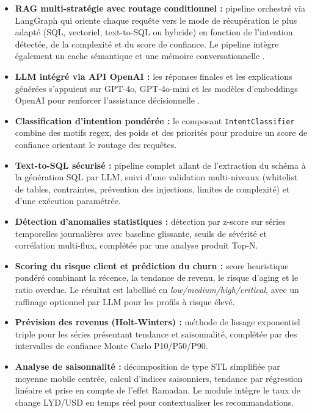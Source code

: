 \documentclass[a4paper,12pt]{report}
\begin{document}
\begin{itemize}
    \item \textbf{RAG multi-stratégie avec routage conditionnel :} pipeline
    orchestré via LangGraph qui oriente chaque requête vers le mode de
    récupération le plus adapté (SQL, vectoriel, text-to-SQL ou hybride) en
    fonction de l'intention détectée, de la complexité et du score de confiance.
    Le pipeline intègre également un cache sémantique et une mémoire
    conversationnelle \cite{ref39}\cite{ref40}.

    \item \textbf{LLM intégré via API OpenAI :} les réponses finales et les
    explications générées s'appuient sur GPT-4o, GPT-4o-mini et les modèles
    d'embeddings OpenAI pour renforcer l'assistance décisionnelle \cite{A4}\cite{ref43}\cite{ref45}.

    \item \textbf{Classification d'intention pondérée :} le composant
    \texttt{IntentClassifier} combine des motifs regex, des poids et des
    priorités pour produire un score de confiance orientant le routage des
    requêtes.

    \item \textbf{Text-to-SQL sécurisé :} pipeline complet allant de l'extraction
    du schéma à la génération SQL par LLM, suivi d'une validation multi-niveaux
    (whitelist de tables, contraintes, prévention des injections, limites de complexité) et d'une exécution paramétrée.

    \item \textbf{Détection d'anomalies statistiques :} détection par z-score sur
    séries temporelles journalières avec baseline glissante, seuils de sévérité
    et corrélation multi-flux, complétée par une analyse produit Top-N.

    \item \textbf{Scoring du risque client et prédiction du churn :} score
    heuristique pondéré combinant la récence, la tendance de revenu, le risque
    d'aging et le ratio overdue. Le résultat est labellisé en
    \textit{low/medium/high/critical}, avec un raffinage optionnel par LLM pour
    les profils à risque élevé.

    \item \textbf{Prévision des revenus (Holt-Winters) :} méthode de lissage
    exponentiel triple pour les séries présentant tendance et saisonnalité,
    complétée par des intervalles de confiance Monte Carlo P10/P50/P90.

    \item \textbf{Analyse de saisonnalité :} décomposition de type STL simplifiée
    par moyenne mobile centrée, calcul d'indices saisonniers, tendance par
    régression linéaire et prise en compte de l'effet Ramadan. Le module intègre
    le taux de change LYD/USD en temps réel pour contextualiser les
    recommandations.


\end{itemize}
\end{document}
